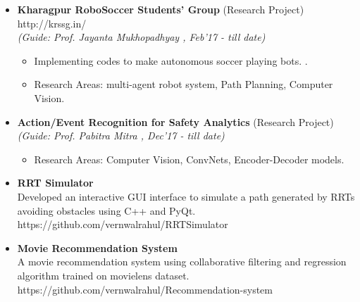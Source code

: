 \documentclass[a4paper,10pt]{article}
\newcommand{\isep}{-2 pt}
\begin{document}
\begin{itemize}
\item \textbf{Kharagpur  RoboSoccer  Students'  Group} (Research Project) \hspace{0.5cm}
{http://krssg.in/}\\
 \emph{(Guide: Prof. Jayanta Mukhopadhyay
, Feb'17 - till date)} \\[-0.6cm]
	\begin{itemize}\itemsep \isep
	\item Implementing codes to make autonomous soccer playing bots. 
.
	\item Research Areas: multi-agent robot system, Path Planning, Computer Vision.
	\end{itemize}

\item \textbf{Action/Event Recognition for Safety Analytics} (Research Project) \hspace{0.5cm}\\
 \emph{(Guide: Prof. Pabitra Mitra
, Dec'17 - till date)} \\[-0.6cm]
	\begin{itemize}\itemsep \isep
	\item Research Areas: Computer Vision, ConvNets, Encoder-Decoder models.
	\end{itemize}	 

\item \textbf{RRT Simulator} \\
	 Developed an interactive GUI interface to simulate a path generated by RRTs avoiding obstacles using C++ and PyQt. \hspace{0.5cm} 
    {https://github.com/vernwalrahul/RRTSimulator} 
	
\item \textbf{Movie Recommendation System} \\ 
	A movie recommendation system using collaborative filtering and regression algorithm trained on movielens dataset. \hspace{0.5cm}
	 {https://github.com/vernwalrahul/Recommendation-system} 
\end{itemize}
\end{document}
